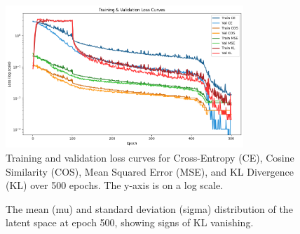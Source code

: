 \documentclass[unnumsec,webpdf,contemporary,medium]{oup-authoring-template}
\begin{document}
\begin{figure}[!ht]
\centering
\includegraphics[width=0.8\textwidth]{figure1.png}
\caption{Training and validation loss curves for Cross-Entropy (CE), Cosine Similarity (COS), Mean Squared Error (MSE), and KL Divergence (KL) over 500 epochs. The y-axis is on a log scale.}\label{fig:loss_curves}
\end{figure}

\begin{figure}[!ht]
    \centering
    \hfill
    \caption{The mean (mu) and standard deviation (sigma) distribution of the latent space at epoch 500, showing signs of KL vanishing.}
    \label{fig:dist_500}
\end{figure}
\end{document}
